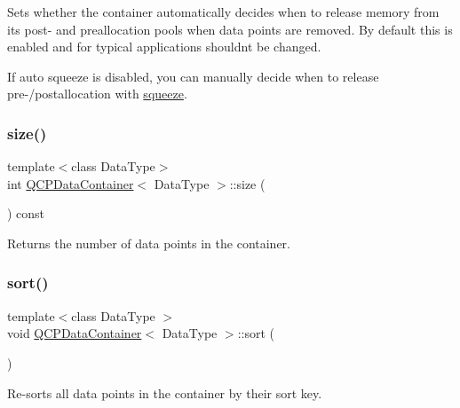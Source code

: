 Sets whether the container automatically decides when to release memory from its post-\/ and preallocation pools when data points are removed. By default this is enabled and for typical applications shouldn\textquotesingle{}t be changed.

If auto squeeze is disabled, you can manually decide when to release pre-\//postallocation with \hyperlink{class_q_c_p_data_container_a82fcc511def22287fc62579d0706387c}{squeeze}. \mbox{\label{class_q_c_p_data_container_a8e9b262c739672e13472d0d45b720258}} 
\subsubsection{\texorpdfstring{size()}{size()}}
{\footnotesize\ttfamily template$<$class Data\+Type$>$ \\
int \hyperlink{class_q_c_p_data_container}{Q\+C\+P\+Data\+Container}$<$ Data\+Type $>$\+::size (\begin{DoxyParamCaption}{ }\end{DoxyParamCaption}) const\hspace{0.3cm}{\ttfamily [inline]}}

Returns the number of data points in the container. \mbox{\label{class_q_c_p_data_container_a75da92e33063b63d6da5014683591d45}} 
\subsubsection{\texorpdfstring{sort()}{sort()}}
{\footnotesize\ttfamily template$<$class Data\+Type $>$ \\
void \hyperlink{class_q_c_p_data_container}{Q\+C\+P\+Data\+Container}$<$ Data\+Type $>$\+::sort (\begin{DoxyParamCaption}{ }\end{DoxyParamCaption})}

Re-\/sorts all data points in the container by their sort key.

